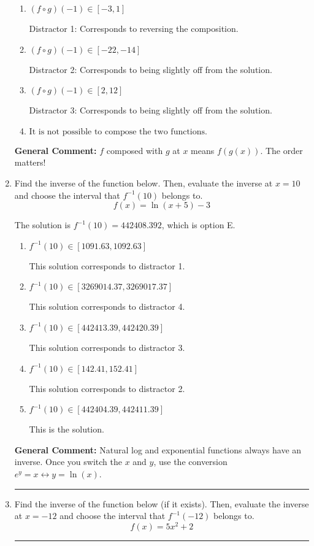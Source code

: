 \documentclass{extbook}[14pt]
\newcommand{\litem}[1]{\item #1

\rule{\textwidth}{0.4pt}}
\begin{document}
\begin{enumerate}
{\begin{enumerate}[label=\Alph*.]
* This is the correct solution
\item \( (f \circ g)(-1) \in [-3, 1] \)

 Distractor 1: Corresponds to reversing the composition.
\item \( (f \circ g)(-1) \in [-22, -14] \)

 Distractor 2: Corresponds to being slightly off from the solution.
\item \( (f \circ g)(-1) \in [2, 12] \)

 Distractor 3: Corresponds to being slightly off from the solution.
\item \( \text{It is not possible to compose the two functions.} \)


\end{enumerate}

\textbf{General Comment:} $f$ composed with $g$ at $x$ means $f(g(x))$. The order matters!
}
\litem{
Find the inverse of the function below. Then, evaluate the inverse at $x = 10$ and choose the interval that $f^{-1}(10)$ belongs to.
\[ f(x) = \ln{(x+5)}-3 \]

The solution is \( f^{-1}(10) = 442408.392 \), which is option E.\begin{enumerate}[label=\Alph*.]
\item \( f^{-1}(10) \in [1091.63, 1092.63] \)

 This solution corresponds to distractor 1.
\item \( f^{-1}(10) \in [3269014.37, 3269017.37] \)

 This solution corresponds to distractor 4.
\item \( f^{-1}(10) \in [442413.39, 442420.39] \)

 This solution corresponds to distractor 3.
\item \( f^{-1}(10) \in [142.41, 152.41] \)

 This solution corresponds to distractor 2.
\item \( f^{-1}(10) \in [442404.39, 442411.39] \)

 This is the solution.
\end{enumerate}

\textbf{General Comment:} Natural log and exponential functions always have an inverse. Once you switch the $x$ and $y$, use the conversion $ e^y = x \leftrightarrow y=\ln(x)$.
}
\litem{
Find the inverse of the function below (if it exists). Then, evaluate the inverse at $x = -12$ and choose the interval that $f^{-1}(-12)$ belongs to.
\[ f(x) = 5 x^2 + 2 \]

}
\end{enumerate}
\end{document}
